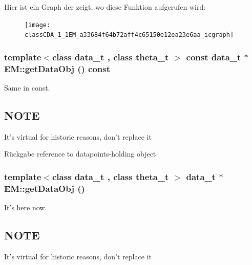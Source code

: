 Hier ist ein Graph der zeigt, wo diese Funktion aufgerufen wird:\nopagebreak
\begin{figure}[H]
\begin{center}
\leavevmode
\texttt{[image: classCDA\_1\_1EM\_a33684f64b72aff4c65150e12ea23e6aa\_icgraph]}
\end{center}
\end{figure}


\hypertarget{classCDA_1_1EM_ac8ac2e223a295ee8f98e13c50bfec454}{
\subsubsection[{getDataObj}]{\setlength{\rightskip}{0pt plus 5cm}template$<$class data\_\-t , class theta\_\-t $>$ const {\bf data\_\-t} $\ast$ EM::getDataObj () const}}
\label{classCDA_1_1EM_ac8ac2e223a295ee8f98e13c50bfec454}


Same in const. 

\hypertarget{GaussianMixtureModel1D_8h_09_09_NOTE}{}\subsection{NOTE}\label{GaussianMixtureModel1D_8h_09_09_NOTE}
It's virtual for historic reasons, don't replace it

\begin{DoxyReturn}{Rückgabe}
reference to datapoints-\/holding object 
\end{DoxyReturn}
\hypertarget{classCDA_1_1EM_a15809e2026eaea4c68b2e3e11c807fff}{
\subsubsection[{getDataObj}]{\setlength{\rightskip}{0pt plus 5cm}template$<$class data\_\-t , class theta\_\-t $>$ {\bf data\_\-t} $\ast$ EM::getDataObj ()}}
\label{classCDA_1_1EM_a15809e2026eaea4c68b2e3e11c807fff}


It's here now. 

\hypertarget{GaussianMixtureModel1D_8h_09_09_NOTE}{}\subsection{NOTE}\label{GaussianMixtureModel1D_8h_09_09_NOTE}
It's virtual for historic reasons, don't replace it

